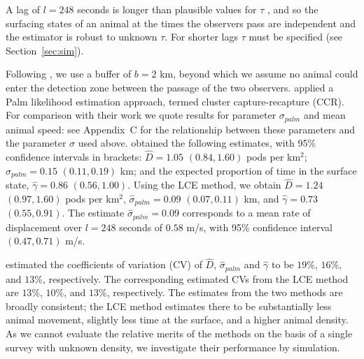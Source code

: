 \documentclass[useAMS, usenatbib, referee]{biom}\usepackage[]{graphicx}\usepackage[]{color}
\begin{document}
A lag of $l=248$ seconds is longer than plausible values for $\tau$ \citep{Stevenson+al:19}, and so the surfacing states of an animal at the times the observers pass are independent and the estimator is robust to unknown $\tau$. For shorter lags $\tau$ must be specified (see Section~\ref{sec:sim}).





Following \cite{Stevenson+al:19}, we use a buffer of $b=2$ km, beyond which we assume no animal could enter the detection zone between the passage of the two observers.  \cite{Stevenson+al:19} applied a Palm likelihood estimation approach, termed cluster capture-recapture (CCR).
For comparison with their work we quote results for parameter $\sigma_{palm}$ and mean animal speed: see Appendix~C for the relationship between these parameters and the parameter $\sigma$ used above. \cite{Stevenson+al:19} obtained the following estimates, with 95\% confidence intervals in brackets: $\hat{D}=1.05$ $(0.84, 1.60)$ pods per km$^2$; $\hat{\sigma}_{palm}=0.15$ $(0.11, 0.19)$ km; and the expected proportion of time in the surface state, $\hat{\gamma}=0.86$ $(0.56, 1.00)$. Using the LCE method, we obtain $\hat{D}=1.24$ $(0.97, 1.60)$ pods per km$^2$, $\hat{\sigma}_{palm}=0.09$ $(0.07, 0.11)$ km, and $\hat{\gamma}=0.73$ $(0.55, 0.91)$. The estimate $\hat{\sigma}_{palm}=0.09$ corresponds to a mean rate of displacement over $l=248$ seconds of $0.58$ m/s, with 95\% confidence interval $(0.47, 0.71)$ m/s.

\cite{Stevenson+al:19} estimated the coefficients of variation (CV) of $\hat{D}$, $\hat{\sigma}_{palm}$ and $\hat{\gamma}$ to be $19$\%, $16$\%, and $13$\%, respectively. The corresponding estimated CVs from the LCE method are $13$\%, $10$\%, and $13$\%, respectively. The estimates from the two methods are broadly consistent; the LCE method estimates there to be substantially less animal movement, slightly less time at the surface, and a higher animal density. As we cannot evaluate the relative merits of the methods on the basis of a single survey with unknown density, we investigate their performance by simulation.
\end{document}
